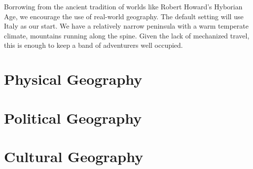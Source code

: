 Borrowing from the ancient tradition of worlds like Robert Howard's Hyborian Age, we encourage the use of real-world geography.
The default setting will use Italy as our start.
We have a relatively narrow peninsula with a warm temperate climate, mountains running along the spine.
Given the lack of mechanized travel, this is enough to keep a band of adventurers well occupied.
\section[Physical]{Physical Geography}
\section[Political]{Political Geography}
\section[Cultural]{Cultural Geography}
